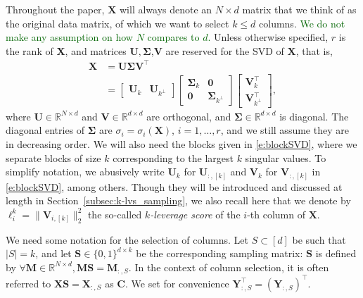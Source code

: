\documentclass[twoside,11pt]{book}
\newcommand{\rev}[1]{\textcolor{darkgreen}{#1}}
\numberwithin{theorem}{chapter}
\numberwithin{definition}{chapter}
\numberwithin{proposition}{chapter}
\numberwithin{corollary}{chapter}
\numberwithin{example}{chapter}
\numberwithin{lemma}{chapter}
\DeclareMathOperator{\Tran}{\intercal}
\begin{document}
Throughout the paper, $\bm{X}$ will always denote an $N\times d$ matrix that we think of as the original data matrix, of which we want to select $k\leq d$ columns. \rev{We do not make any assumption on how $N$ compares to $d$.} Unless otherwise specified, $r$ is the rank of $\bm{X}$, and matrices $\bm{U},\bm{\Sigma}$,$\bm{V}$ are reserved for the SVD of $\bm{X}$, that is,
\begin{align}
   \bm{X} &= \bm{U}\bm{\Sigma}\bm{V}^{\Tran}\\
   &=
\left[
\begin{array}{c|c}
\bm{U}_{k} & \bm{U}_{k^{\perp}}
\end{array}
\right]
\left[
\begin{array}{c|c}
\bm{\Sigma}_{k} & \bm{0} \\
\hline
\bm{0} & \bm{\Sigma}_{k^{\perp}}
\end{array}
\right]
\left[
\begin{array}{c}
\bm{V}_{k}^{\Tran} \\
\hline
\bm{V}_{k^{\perp}}^{\Tran}
\end{array}
\right],
\label{e:blockSVD}
\end{align}
where $\bm{U} \in \mathbb{R}^{N\times d}$ and $\bm{V} \in \mathbb{R}^{d \times d}$ are orthogonal, and $\bm{\Sigma} \in \mathbb{R}^{d \times d}$ is diagonal. The diagonal entries of $\bm{\Sigma}$ are $\sigma_i=\sigma_i(\bm{X})$, $i=1,\dots,r$, and we still assume they are in decreasing order. We will also need the blocks given in \eqref{e:blockSVD}, where we separate blocks of size $k$ corresponding to the largest $k$ singular values. To simplify notation, we abusively write $\bm{U}_{k}$ for $\bm{U}_{:,[k]}$ and $\bm{V}_{k}$ for $\bm{V}_{:,[k]}$ in \eqref{e:blockSVD}, among others. Though they will be introduced and discussed at length in Section~\ref{subsec:k-lvs_sampling}, we also recall here that we denote by $\ell_{i}^{k} = \|\bm{V}_{i,[k]}\|_{2}^{2}$ the so-called \emph{ $k$-leverage score} of the $i$-th column of $\bm{X}$.

We need some notation for the selection of columns. Let $S \subset [d]$ be such that $\vert S\vert =k$, and let $\bm{S} \in \{0,1\}^{d \times k}$ be the corresponding sampling matrix: $\bm{S}$ is defined by $\forall \bm{M} \in \mathbb{R}^{N\times d}, \bm{M}\bm{S} = \bm{M}_{:,S}$. In the context of column selection, it is often referred to $\bm{X}\bm{S} = \bm{X}_{:,S}$ as $\bm{C}$. We set for convenience $\bm{Y}_{:,S}^{\Tran} = (\bm{Y}_{:,S})^{\Tran}$.
\end{document}
